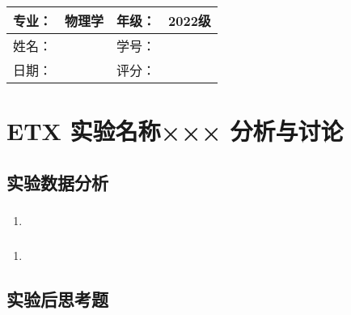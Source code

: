 \documentclass[dvipsnames, svgnames,a4paper,11pt]{article}
\begin{document}
	\begin{table}
		\renewcommand\arraystretch{1.7}
		\begin{tabularx}{\textwidth}{|X|X|X|X|}
			\hline
			专业：& 物理学 &年级：& 2022级\\
			\hline
			姓名： &  & 学号：& \\
			\hline
			日期：&  & 评分： &\\
			\hline
		\end{tabularx}
	\end{table}
	
	\section{ETX 实验名称××× \quad\heiti 分析与讨论}
	
	\subsection{实验数据分析}
	
	\subsubsection{}
	\begin{enumerate}
		\item 
	\end{enumerate}
	
	\subsubsection{}
	\begin{enumerate}
		\item 
	\end{enumerate}
	
	\subsubsection{}
	
	
	\subsection{实验后思考题}
	
	\begin{question}
		
	\end{question}
	
	\begin{question}
		
	\end{question}
	
\end{document}
